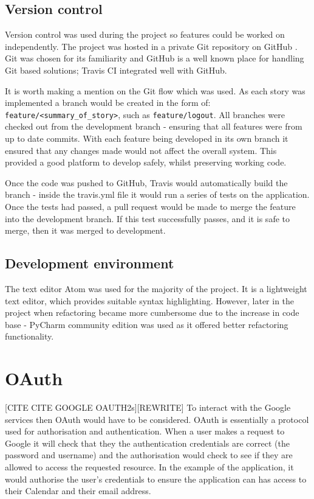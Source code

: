 \subsection{Version control}
Version control was used during the project so features could be worked on independently. The project was hosted in a private Git \cite{citeulike:14023846} repository on GitHub \cite{citeulike:13269771}. Git was chosen for its familiarity and GitHub is a well known place for handling Git based solutions; Travis CI integrated well with GitHub.

It is worth making a mention on the Git flow which was used. As each story was implemented a branch would be created in the form of: \texttt{feature/<summary\_of\_story>}, such as \texttt{feature/logout}. All branches were checked out from the development branch - ensuring that all features were from up to date commits. With each feature being developed in its own branch it ensured that any changes made would not affect the overall system. This provided a good platform to develop safely, whilst preserving working code.

Once the code was pushed to GitHub, Travis would automatically build the branch - inside the travis.yml file it would run a series of tests on the application. Once the tests had passed, a pull request would be made to merge the feature into the development branch. If this test successfully passes, and it is safe to merge, then it was merged to development.

\subsection{Development environment}
The text editor Atom \cite{citeulike:14023852} was used for the majority of the project. It is a lightweight text editor, which provides suitable syntax highlighting. However, later in the project when refactoring became more cumbersome due to the increase in code base - PyCharm community edition \cite{citeulike:14023855} was used as it offered better refactoring functionality.

\section{OAuth} \label{design:oauth}
[CITE CITE GOOGLE OAUTH2s][REWRITE]
To interact with the Google services then OAuth would have to be considered. OAuth is essentially a protocol used for authorisation and authentication. When a user makes a request to Google it will check that they the authentication credentials are correct (the password and username) and the authorisation would check to see if they are allowed to access the requested resource. In the example of the application, it would authorise the user's credentials to ensure the application can has access to their Calendar and their email address.

